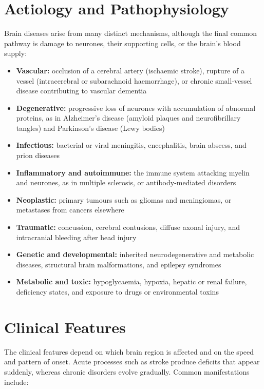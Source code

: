 \section*{Aetiology and Pathophysiology}
Brain diseases arise from many distinct mechanisms, although the final common pathway is damage to neurones, their supporting cells, or the brain's blood supply:

\begin{itemize}
    \item \textbf{Vascular:} occlusion of a cerebral artery (ischaemic stroke), rupture of a vessel (intracerebral or subarachnoid haemorrhage), or chronic small-vessel disease contributing to vascular dementia
    \item \textbf{Degenerative:} progressive loss of neurones with accumulation of abnormal proteins, as in Alzheimer's disease (amyloid plaques and neurofibrillary tangles) and Parkinson's disease (Lewy bodies)
    \item \textbf{Infectious:} bacterial or viral meningitis, encephalitis, brain abscess, and prion diseases
    \item \textbf{Inflammatory and autoimmune:} the immune system attacking myelin and neurones, as in multiple sclerosis, or antibody-mediated disorders
    \item \textbf{Neoplastic:} primary tumours such as gliomas and meningiomas, or metastases from cancers elsewhere
    \item \textbf{Traumatic:} concussion, cerebral contusions, diffuse axonal injury, and intracranial bleeding after head injury
    \item \textbf{Genetic and developmental:} inherited neurodegenerative and metabolic diseases, structural brain malformations, and epilepsy syndromes
    \item \textbf{Metabolic and toxic:} hypoglycaemia, hypoxia, hepatic or renal failure, deficiency states, and exposure to drugs or environmental toxins
\end{itemize}

\section*{Clinical Features}
The clinical features depend on which brain region is affected and on the speed and pattern of onset. Acute processes such as stroke produce deficits that appear suddenly, whereas chronic disorders evolve gradually. Common manifestations include:

